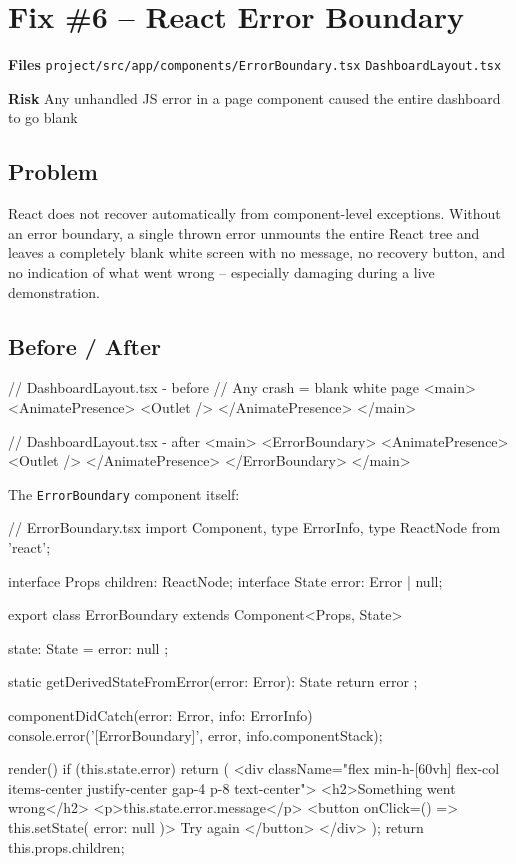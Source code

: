 \documentclass[12pt,a4paper]{report}
\newcommand{\diffL}{\noindent\begin{minipage}[t]{0.485\linewidth}}
\newcommand{\diffR}{\end{minipage}\hfill\begin{minipage}[t]{0.485\linewidth}}
\newcommand{\diffend}{\end{minipage}\par\smallskip}
\newcommand{\inforow}[2]{%
	\noindent
	\begin{tcolorbox}[
		colback   = lightblue,
		colframe  = midblue,
		arc       = 2pt,
		left      = 6pt, right = 6pt, top = 2pt, bottom = 2pt,
		sidebyside, sidebyside align = top seam,
		lefthand width = 3.2cm,
		segmentation hidden,
		]
		\textbf{\color{brandblue}\small #1}
		\tcblower
		{\small\color{labelgray} #2}
	\end{tcolorbox}\vspace{2pt}%
}
\newcommand{\file}[1]{\texttt{\small #1}}
\begin{document}
	\section{Fix \#6 -- React Error Boundary}
	
	\inforow{Files}{\file{project/src/app/components/ErrorBoundary.tsx} \quad \file{DashboardLayout.tsx}}
	\inforow{Risk}{Any unhandled JS error in a page component caused the entire dashboard to go blank}
	
	\subsection*{Problem}
	
	React does not recover automatically from component-level exceptions. Without an
	error boundary, a single thrown error unmounts the entire React tree and leaves
	a completely blank white screen with no message, no recovery button, and no
	indication of what went wrong -- especially damaging during a live demonstration.
	
	\subsection*{Before / After}
	
	\diffL
	\begin{beforecode}
		// DashboardLayout.tsx - before
		// Any crash = blank white page
		<main>
		<AnimatePresence>
		<Outlet />
		</AnimatePresence>
		</main>
	\end{beforecode}
	\diffR
	\begin{aftercode}
		// DashboardLayout.tsx - after
		<main>
		<ErrorBoundary>
		<AnimatePresence>
		<Outlet />
		</AnimatePresence>
		</ErrorBoundary>
		</main>
	\end{aftercode}
	\diffend
	
	\noindent The \file{ErrorBoundary} component itself:
	
	\begin{codebox}
		// ErrorBoundary.tsx
		import { Component, type ErrorInfo, type ReactNode } from 'react';
		
		interface Props { children: ReactNode; }
		interface State { error: Error | null; }
		
		export class ErrorBoundary extends Component<Props, State> {
			state: State = { error: null };
			
			static getDerivedStateFromError(error: Error): State {
				return { error };
			}
			
			componentDidCatch(error: Error, info: ErrorInfo) {
				console.error('[ErrorBoundary]', error, info.componentStack);
			}
			
			render() {
				if (this.state.error) {
					return (
					<div className="flex min-h-[60vh] flex-col items-center
					justify-center gap-4 p-8 text-center">
					<h2>Something went wrong</h2>
					<p>{this.state.error.message}</p>
					<button onClick={() => this.setState({ error: null })}>
					Try again
					</button>
					</div>
					);
				}
				return this.props.children;
			}
		}
	\end{codebox}
	
\end{document}
